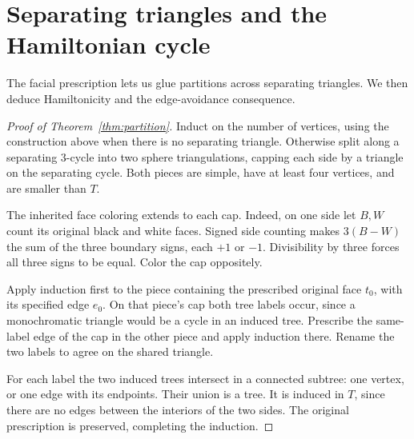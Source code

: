 \documentclass[11pt]{article}
\theoremstyle{remark}
\numberwithin{equation}{section}
\begin{document}
\section{Separating triangles and the Hamiltonian cycle}\label{sec:assembly}

The facial prescription lets us glue partitions across separating
triangles. We then deduce Hamiltonicity and the edge-avoidance consequence.

\begin{proof}[Proof of Theorem~\ref{thm:partition}]
Induct on the number of vertices, using the construction
above when there is no separating triangle.
Otherwise split along a separating \(3\)-cycle into
two sphere triangulations, capping each side by a
triangle on the separating cycle. Both pieces are
simple, have at least four vertices, and are smaller
than \(T\).

The inherited face coloring extends to each cap.
Indeed, on one side let \(B,W\) count its original
black and white faces. Signed side counting makes
\(3(B-W)\) the sum of the three boundary signs,
each \(+1\) or \(-1\). Divisibility by three
forces all three signs to be equal. Color the
cap oppositely.

Apply induction first to the piece containing
the prescribed original face \(t_0\), with its
specified edge \(e_0\). On that piece's cap both
tree labels occur, since a monochromatic triangle
would be a cycle in an induced tree.
Prescribe the same-label edge of the cap in the
other piece and apply induction there. Rename
the two labels to agree on the shared triangle.

For each label the two induced trees intersect
in a connected subtree: one vertex, or one edge
with its endpoints. Their union is a tree.
It is induced in \(T\), since there are no edges
between the interiors of the two sides.
The original prescription is preserved, completing
the induction.
\end{proof}
\end{document}
